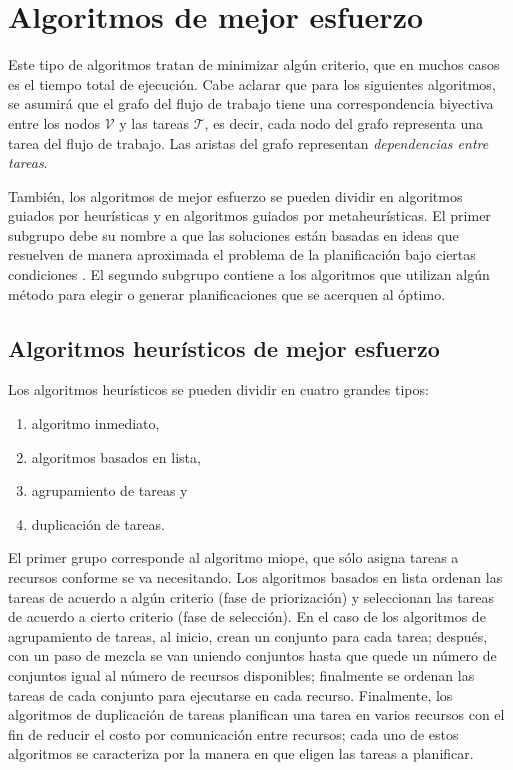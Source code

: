 \section{Algoritmos de mejor esfuerzo}
Este tipo de algoritmos tratan de minimizar algún criterio, que en muchos casos es el tiempo total de ejecución. Cabe aclarar que para los siguientes algoritmos, se asumirá que el grafo del flujo de trabajo tiene una correspondencia biyectiva entre los nodos $\mathcal{V}$ y las tareas $\mathcal{T}$, es decir, cada nodo del grafo representa una tarea del flujo de trabajo. Las aristas del grafo representan \emph{dependencias entre tareas}.

También, los algoritmos de mejor esfuerzo se pueden dividir en algoritmos guiados por heurísticas y en algoritmos guiados por metaheurísticas. El primer subgrupo debe su nombre a que las soluciones están basadas en ideas que resuelven de manera aproximada el problema de la planificación bajo ciertas condiciones \cite{yu2008workflow}. El segundo subgrupo contiene a los algoritmos que utilizan algún método para elegir o generar planificaciones que se acerquen al óptimo.

\subsection{Algoritmos heurísticos de mejor esfuerzo}
Los algoritmos heurísticos se pueden dividir en cuatro grandes tipos: 
\begin{enumerate}
\item{algoritmo inmediato,}
\item{algoritmos basados en lista,}
\item{agrupamiento de tareas y}
\item{duplicación de tareas.}
\end{enumerate}

El primer grupo corresponde al algoritmo miope, que sólo asigna tareas a recursos conforme se va necesitando. Los algoritmos basados en lista ordenan las tareas de acuerdo a algún criterio (fase de priorización) y seleccionan las tareas de acuerdo a cierto criterio (fase de selección). En el caso de los algoritmos de agrupamiento de tareas, al inicio, crean un conjunto para cada tarea; después, con un paso de mezcla se van uniendo conjuntos hasta que quede un número de conjuntos igual al número de recursos disponibles; finalmente se ordenan las tareas de cada conjunto para ejecutarse en cada recurso. Finalmente, los algoritmos de duplicación de tareas planifican una tarea en varios recursos con el fin de reducir el costo por comunicación entre recursos; cada uno de estos algoritmos se caracteriza por la manera en que eligen las tareas a planificar.

